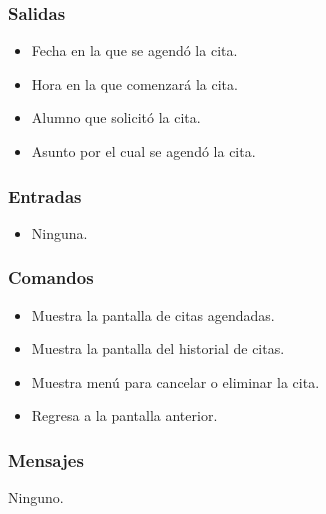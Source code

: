 
\subsubsection{Salidas}
	\begin{itemize}
		\item Fecha en la que se agendó la cita.
		\item Hora en la que comenzará la cita.
			\item Alumno que solicitó la cita.
		\item Asunto por el cual se agendó la cita.
	\end{itemize}

\subsubsection{Entradas}

\begin{itemize}
	\item Ninguna.
\end{itemize}

\subsubsection{Comandos}
\begin{itemize}
	\item {} Muestra la pantalla de citas agendadas.
	\item {} Muestra la pantalla del historial de citas.
	\item {} Muestra menú para cancelar o eliminar la cita.
	\item {} Regresa a la pantalla anterior.
\end{itemize}

\subsubsection{Mensajes}
\begin{Citemize}
	\item Ninguno.
\end{Citemize}

\pagebreak



